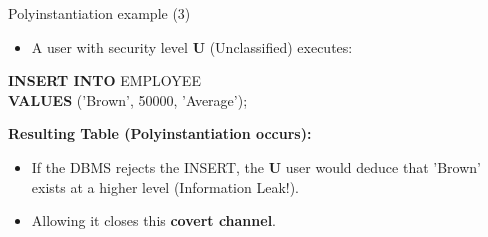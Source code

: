 \begin{frame}{Polyinstantiation example (3)}
    \large
    \vspace{-0.05cm}
    \begin{itemize}
        \item A user with security level \textbf{U} (Unclassified) executes:
    \end{itemize}
    
    \vspace{0.05cm}
    \begin{flushleft}
        \ttfamily \textbf{INSERT INTO} EMPLOYEE \\
        \textbf{VALUES} ('Brown', 50000, 'Average');
    \end{flushleft}
    
    \vspace{0.03cm}
    \textbf{Resulting Table (Polyinstantiation occurs):}
    
    \begin{center}
    \vspace{-0.2cm}
    \end{center}
    
    \vspace{0.01cm}
    \begin{itemize}
        \normalsize
        \item If the DBMS rejects the INSERT, the \textbf{U} user would deduce that 'Brown' exists at a higher level (Information Leak!).
        \item Allowing it closes this \textbf{covert channel}.
    \end{itemize}
\end{frame}

